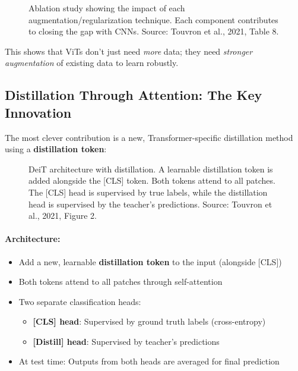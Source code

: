 \documentclass{article}
\begin{document}
\begin{figure}[h]
\centering
{}
\caption{Ablation study showing the impact of each augmentation/regularization technique. Each component contributes to closing the gap with CNNs. Source: Touvron et al., 2021, Table 8.}
\end{figure}

This shows that ViTs don't just need \textit{more} data; they need \textit{stronger augmentation} of existing data to learn robustly.

\subsection{Distillation Through Attention: The Key Innovation}

The most clever contribution is a new, Transformer-specific distillation method using a \textbf{distillation token}:

\begin{figure}[h]
\centering
{}
\caption{DeiT architecture with distillation. A learnable distillation token is added alongside the [CLS] token. Both tokens attend to all patches. The [CLS] head is supervised by true labels, while the distillation head is supervised by the teacher's predictions. Source: Touvron et al., 2021, Figure 2.}
\end{figure}

\paragraph{Architecture:}
\begin{itemize}
\item Add a new, learnable \textbf{distillation token} to the input (alongside [CLS])
\item Both tokens attend to all patches through self-attention
\item Two separate classification heads:
    \begin{itemize}
    \item \textbf{[CLS] head}: Supervised by ground truth labels (cross-entropy)
    \item \textbf{[Distill] head}: Supervised by teacher's predictions
    \end{itemize}
\item At test time: Outputs from both heads are averaged for final prediction
\end{itemize}
\end{document}
